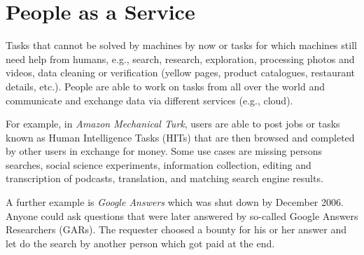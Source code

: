 \documentclass[a4paper]{article}
\begin{document}
\section{People as a Service}
Tasks that cannot be solved by machines by now or tasks for which machines still need help from humans,
e.g., search, research, exploration, processing photos and videos, data cleaning or verification (yellow pages, product catalogues, restaurant details, etc.).
People are able to work on tasks from all over the world and communicate and exchange data via different services (e.g., cloud).

For example, in \emph{Amazon Mechanical Turk}, users are able to post jobs or tasks known as Human Intelligence Tasks (HITs) that are then browsed and completed by other users in exchange for money.
Some use cases are missing persons searches, social science experiments, information collection, editing and transcription of podcasts, translation, and matching search engine results.

A further example is \emph{Google Answers} which was shut down by December 2006.
Anyone could ask questions that were later answered by so-called Google Answers Researchers (GARs).
The requester choosed a bounty for his or her answer and let do the search by another person which got paid at the end.
\end{document}
